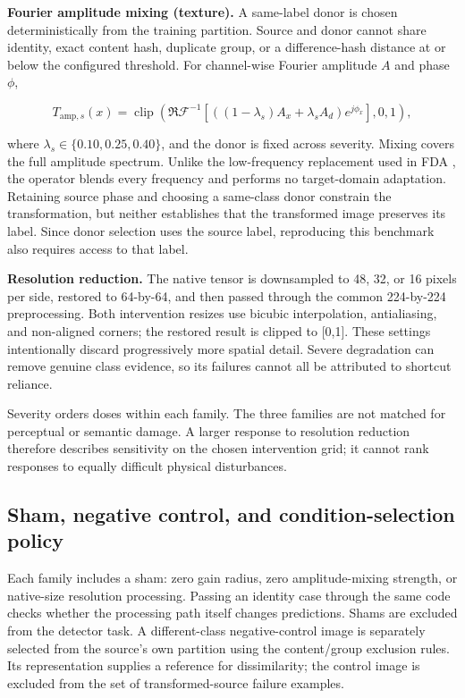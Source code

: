 \textbf{Fourier amplitude mixing (texture).} A same-label donor is chosen deterministically from the training partition. Source and donor cannot share identity, exact content hash, duplicate group, or a difference-hash distance at or below the configured threshold. For channel-wise Fourier amplitude \(A\) and phase \(\phi\),

\[
T_{\mathrm{amp},s}(x)=\operatorname{clip}\!\left(
 \Re\mathcal{F}^{-1}\!\left[
 ((1-\lambda_s)A_x+\lambda_s A_d)e^{j\phi_x}
 \right],0,1\right),
\]

where \(\lambda_s\in\{0.10,0.25,0.40\}\), and the donor is fixed across severity. Mixing covers the full amplitude spectrum. Unlike the low-frequency replacement used in FDA \cite{fda}, the operator blends every frequency and performs no target-domain adaptation. Retaining source phase and choosing a same-class donor constrain the transformation, but neither establishes that the transformed image preserves its label. Since donor selection uses the source label, reproducing this benchmark also requires access to that label.

\textbf{Resolution reduction.} The native tensor is downsampled to 48, 32, or 16 pixels per side, restored to 64-by-64, and then passed through the common 224-by-224 preprocessing. Both intervention resizes use bicubic interpolation, antialiasing, and non-aligned corners; the restored result is clipped to [0,1]. These settings intentionally discard progressively more spatial detail. Severe degradation can remove genuine class evidence, so its failures cannot all be attributed to shortcut reliance.

Severity orders doses within each family. The three families are not matched for perceptual or semantic damage. A larger response to resolution reduction therefore describes sensitivity on the chosen intervention grid; it cannot rank responses to equally difficult physical disturbances.

\subsection{Sham, negative control, and condition-selection policy}

Each family includes a sham: zero gain radius, zero amplitude-mixing strength, or native-size resolution processing. Passing an identity case through the same code checks whether the processing path itself changes predictions. Shams are excluded from the detector task. A different-class negative-control image is separately selected from the source's own partition using the content/group exclusion rules. Its representation supplies a reference for dissimilarity; the control image is excluded from the set of transformed-source failure examples.

